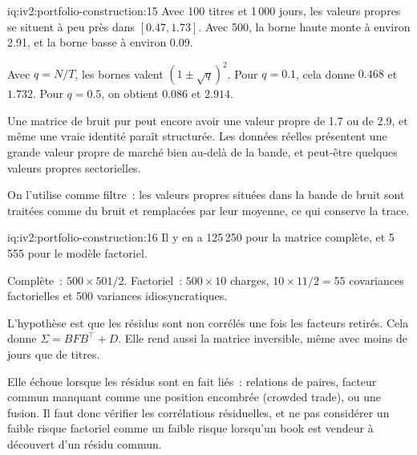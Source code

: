 \begin{solution}{iq:iv2:portfolio-construction:15}
Avec 100 titres et 1\,000 jours, les valeurs propres se situent à peu près dans $[0.47, 1.73]$. Avec 500, la borne haute monte à environ 2.91, et la borne basse à environ 0.09.

Avec $q = N/T$, les bornes valent $(1 \pm \sqrt{q})^2$. Pour $q = 0.1$, cela donne $0.468$ et $1.732$. Pour $q = 0.5$, on obtient $0.086$ et $2.914$.

Une matrice de bruit pur peut encore avoir une valeur propre de 1.7 ou de 2.9, et même une vraie identité paraît structurée. Les données réelles présentent une grande valeur propre de marché bien au-delà de la bande, et peut-être quelques valeurs propres sectorielles.

On l'utilise comme filtre~: les valeurs propres situées dans la bande de bruit sont traitées comme du bruit et remplacées par leur moyenne, ce qui conserve la trace.

\end{solution}

\begin{solution}{iq:iv2:portfolio-construction:16}
Il y en a 125\,250 pour la matrice complète, et 5\,555 pour le modèle factoriel.

Complète~: $500 \times 501/2$. Factoriel~: $500 \times 10$ charges, $10 \times 11/2 = 55$ covariances factorielles et 500 variances idiosyncratiques.

L'hypothèse est que les résidus sont non corrélés une fois les facteurs retirés. Cela donne $\Sigma = BFB^\top + D$. Elle rend aussi la matrice inversible, même avec moins de jours que de titres.

Elle échoue lorsque les résidus sont en fait liés~: relations de paires, facteur commun manquant comme une position encombrée (crowded trade), ou une fusion. Il faut donc vérifier les corrélations résiduelles, et ne pas considérer un faible risque factoriel comme un faible risque lorsqu'un book est vendeur à découvert d'un résidu commun.

\end{solution}

